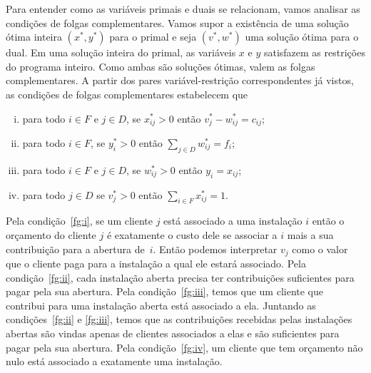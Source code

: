 Para entender como as variáveis primais e duais se relacionam, vamos analisar as condições de folgas complementares. Vamos supor a existência de uma solução ótima inteira $(x^*,y^*)$ para o primal e seja $(v^*,w^*)$ uma solução ótima para o dual. Em uma solução inteira do primal, as variáveis $x$ e $y$ satisfazem as restrições do programa inteiro. Como ambas são soluções ótimas, valem as folgas complementares. A partir dos pares variável-restrição correspondentes já vistos, as condições de folgas complementares estabelecem que
\begin{enumerate}[(i)]
    \item para todo $i \in F$ e $j \in D$, se $x^*_{ij} > 0$ então $v^*_j - w^*_{ij} = c_{ij}$\label{fg:i};
    \item para todo $ i \in F$, se $y^*_i > 0$ então $\sum_{j \in D} w^*_{ij} = f_i$\label{fg:ii};
    \item para todo $i \in F$ e $ j \in D$, se $w^*_{ij}>0$ então $ y_i = x_{ij}$\label{fg:iii};
    \item para todo $j \in D$ se $v^*_j > 0$  então $\sum_{i \in F}x^*_{ij} = 1$\label{fg:iv}.
\end{enumerate}
Pela condição~\eqref{fg:i}, se um cliente $j$ está associado a uma instalação $i$ então o orçamento do cliente $j$ é exatamente o custo dele se associar a $i$ mais a sua contribuição para a abertura de~$i$. Então podemos interpretar $v_j$ como o valor que o cliente paga para a instalação a qual ele estará associado. 
Pela condição~\eqref{fg:ii}, cada instalação aberta precisa ter contribuições suficientes para pagar pela sua abertura. Pela condição~\eqref{fg:iii}, temos que um cliente que contribui para uma instalação aberta está associado a ela. Juntando as condições~\eqref{fg:ii} e \eqref{fg:iii}, temos que as contribuições recebidas pelas instalações abertas são vindas apenas de clientes associados a elas e são suficientes para pagar pela sua abertura. 
Pela condição~\eqref{fg:iv}, um cliente que tem orçamento não nulo está associado a exatamente uma instalação.
